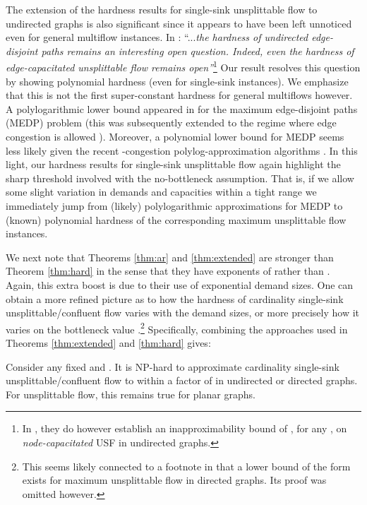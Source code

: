 \documentclass[12pt]{article}
\begin{document}
The extension of the hardness results for single-sink unsplittable flow to undirected graphs is also significant since
it appears to have been left unnoticed even
for  general multiflow instances.
In \cite{guruswami2003near}: ``...{\em the hardness of undirected edge-disjoint paths remains an
interesting open question. Indeed, even the hardness of
edge-capacitated unsplittable flow remains open''}\footnote{In \cite{guruswami2003near}, they do however establish
an inapproximability bound of , for any ,
on {\em node-capacitated} {\sf USF} in undirected graphs.}  Our result resolves this question by showing
polynomial hardness (even for single-sink instances). We emphasize that this is not the first
super-constant hardness for general multiflows however.
  A polylogarithmic  lower bound appeared in \cite{andrews2006logarithmic} for the maximum
  edge-disjoint paths (MEDP) problem (this was subsequently extended to the regime where edge congestion is
  allowed \cite{andrews2010inapproximability}).
Moreover,  a polynomial lower bound for MEDP seems less likely given the recent -congestion polylog-approximation
algorithms \cite{chuzhoy2012routing,chuzhoy2012polylogarithimic}.
In this light, our hardness results for single-sink
unsplittable flow again highlight the sharp threshold involved with the no-bottleneck assumption.
That is, if we allow some slight
variation in demands and capacities within a tight range   we immediately jump from (likely)
polylogarithmic approximations for MEDP to  (known) polynomial hardness of the corresponding maximum
unsplittable flow instances.



We next note that Theorems \ref{thm:ar} and \ref{thm:extended} are stronger than Theorem \ref{thm:hard}
in the sense that they have exponents of  rather than . Again, this extra boost is due to their
use of exponential demand sizes. One can obtain
a more refined picture as to how the hardness of cardinality single-sink unsplittable/confluent flow varies with
 the demand sizes, or more precisely how it varies on the bottleneck
 value .\footnote{This seems likely connected to  a footnote in \cite{azar2001strongly}
 that a lower bound of the
 form  exists for maximum unsplittable flow in
 directed graphs. Its proof was omitted however.}
Specifically, combining the approaches used in Theorems \ref{thm:extended} and \ref{thm:hard} gives:
\begin{thm}
\label{thm:harder} Consider any fixed  and  .
It is NP-hard to approximate cardinality single-sink unsplittable/confluent flow
to within a factor of 
in undirected or directed graphs. For unsplittable flow, this remains true for planar graphs.
\end{thm}
\end{document}
